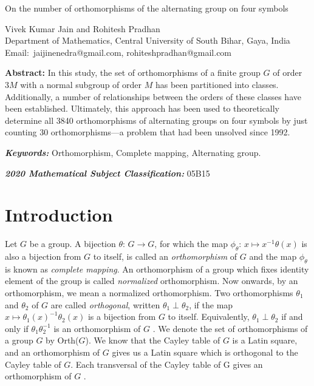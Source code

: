 \documentclass[11pt,a4paper]{article}
\theoremstyle{definition}
\theoremstyle{remark}
\begin{document}
	
	
	\begin{center}
		\huge
		{On the number of orthomorphisms of the alternating group on four symbols} 
	\end{center}
		\begin{center}
	  Vivek Kumar Jain and	Rohitesh Pradhan\\
	Department of Mathematics, Central University of South Bihar, Gaya, India\\
		Email:~jaijinenedra@gmail.com, rohiteshpradhan@gmail.com
	\end{center}

	\large{\textbf{Abstract:}}
In this study, the set of orthomorphisms of a finite group $G$ of order $3M$ with a normal subgroup of order $M$ has been partitioned into classes. Additionally, a number of relationships between the orders of these classes have been established. Ultimately, this approach has been used to theoretically determine all 3840 orthomorphisms of alternating groups on four symbols by just counting 30 orthomorphisms—a problem that had been unsolved since 1992.



	\vspace{.5cm}
	
	\noindent \textbf{\textit{Keywords:}} Orthomorphism, Complete mapping, Alternating group.
		\smallskip
	
	\noindent \textbf{\textit{2020 Mathematical Subject Classification:}} 05B15
	
	\section{Introduction}\label{sec1}
	Let $G$ be a group. A bijection $\theta$: $G \rightarrow G$, for which the map $\phi_{\theta}$: $x \mapsto x^{-1}\theta(x)$ is also a bijection from $G$ to itself, is called an \emph{orthomorphism} of $G$ and the map $\phi_{\theta}$ is known as \emph{complete mapping}. An orthomorphism of a group which fixes identity element of the group is called \emph{normalized} orthomorphism. Now onwards, by an orthomorphism, we mean a normalized orthomorphism.  Two orthomorphisms $\theta_{1}$ and $\theta_{2}$ of $G$ are called \emph{orthogonal}, written  $\theta_{1} \perp \theta_{2}$, if the map  $x \mapsto \theta_{1}(x)^{-1}\theta_{2}(x)$ is a bijection from $G$ to itself. Equivalently, $\theta_{1} \perp \theta_{2}$ if and only if $\theta_{1}\theta_{2}^{-1}$ is  an orthomorphism of $G$ \cite[Corollary 1.31, p. 22]{evans}. We denote the set of orthomorphisms of a group $G$ by Orth($G$). We know  that the Cayley table of $G$ is  a Latin square, and an orthomorphism of $G$ gives us a Latin square which is orthogonal to the Cayley table of $G$. Each transversal of the Cayley table of G gives an orthomorphism of $G$ \cite{wanless}.
	
\end{document}
